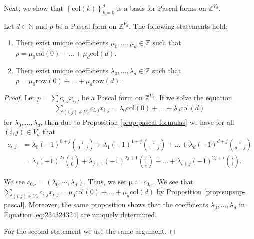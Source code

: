 Next, we show that \( \left\{ \mathrm{col}(k) \right\}_{k=0}^{d} \) is a basis for Pascal forms on \( \mathbb{Z}^{V_d} \).

\begin{proposition}\label{prop:pascal-basis}
    Let \( d \in \mathbb{N} \) and \( p \) be a Pascal form on \( \mathbb Z^{V_d} \). The following statements hold:
    \begin{enumerate}
        \item There exist unique coefficients \( \mu_0, \dots, \mu_d \in \mathbb{Z} \) such that 
        \( p = \mu_0 \mathrm{col}(0) + \dots + \mu_d \mathrm{col}(d) \).

        \item There exist unique coefficients \( \lambda_0, \dots, \lambda_d \in \mathbb{Z} \) such that 
        \( p = \mu_0 \mathrm{row}(0) + \dots + \mu_d \mathrm{row}(d) \).
    \end{enumerate}
\end{proposition}

\begin{proof}
    Let \( p = \sum c_{i,j}x_{i,j}\) be a Pascal form on \( \mathbb{Z}^{V_d} \). If we solve the equation
    \begin{align}\label{eq:234324324}
        \sum_{(i,j) \in V_d} c_{i,j}x_{i,j} = \lambda_0 \mathrm{col}(0) + \dots + \lambda_d \mathrm{col}(d)
    \end{align}
    for \( \lambda_0, \dots, \lambda_d \), then due to Proposition \ref{prop:pascal-formulas} we have for all \( (i,j)\in V_d \) that
    \begin{align*}
        c_{i,j} &= \lambda_0 (-1)^{0+j} \binom{i}{0-j} + \lambda_1 (-1)^{1+j} \binom{i}{1-j} + \dots + \lambda_d (-1)^{d+j} \binom{i}{d-j} \\
        &= \lambda_j (-1)^{2j} \binom{i}{0} + \lambda_{j+1} (-1)^{2j+1} \binom{i}{1} + \dots + \lambda_{i+j} (-1)^{2j+i} \binom{i}{i}.
    \end{align*}

    We see \(c_{0, \cdot} = (\lambda_0, \cdots, \lambda_d) \). Thus, we set \( \boldsymbol \mu \coloneqq c_{0, \cdot} \). We see that \( \sum_{(i,j) \in V_d} c_{i,j}x_{i,j} = \mu_0 \mathrm{col}(0) + \dots + \mu_d \mathrm{col}(d) \) by Proposition \ref{prop:supsup-pascal}. Moreover, the same proposition shows that the coefficients \( \lambda_0, \dots, \lambda_d \) in Equation \ref{eq:234324324} are uniquely determined. 
    
    For the second statement we use the same argument.
\end{proof}

